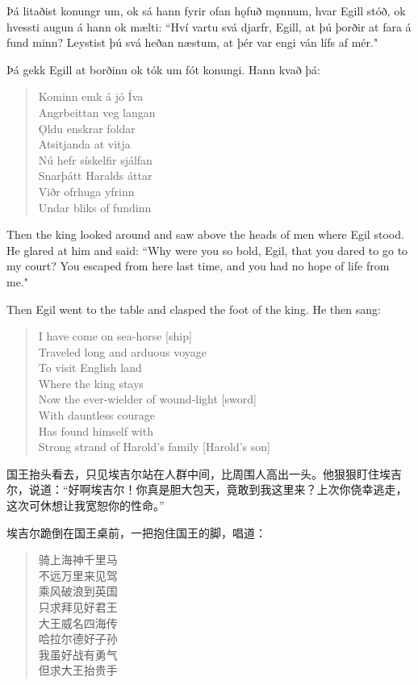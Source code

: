 \begin{paracol}{2}
  Þá litaðist konungr um, ok sá hann fyrir ofan hǫfuð mǫnnum, hvar Egill stóð, ok hvessti augun á hann ok mælti: ``Hví vartu svá djarfr, Egill, at þú þorðir at fara á fund minn? Leystist þú svá heðan næstum, at þér var engi ván lífs af mér."

  Þá gekk Egill at borðinu ok tók um fót konungi. Hann kvað þá:
  \begin{quote}
    Kominn emk á jó Íva\\
    Angrbeittan veg langan\\
    \MakeUppercase{ǫ}ldu enskrar foldar\\
    Atsitjanda at vitja\\
    Nú hefr sískelfir sjálfan\\
    Snarþátt Haralds áttar\\
    Viðr ofrhuga yfrinn\\
    Undar bliks of fundinn
  \end{quote}
  \switchcolumn
  Then the king looked around and saw above the heads of men where Egil stood. He glared at him and said: ``Why were you so bold, Egil, that you dared to go to my court? You escaped from here last time, and you had no hope of life from me."

  Then Egil went to the table and clasped the foot of the king. He then sang:
  \begin{quote}
    I have come on sea-horse [ship]\\
    Traveled long and arduous voyage\\
    To visit English land\\
    Where the king stays\\
    Now the ever-wielder of wound-light [sword]\\
    With dauntless courage\\
    Has found himself with\\
    Strong strand of Harold's family [Harold's son]
  \end{quote}
\end{paracol}
\begin{translation*}{}
  国王抬头看去，只见埃吉尔站在人群中间，比周围人高出一头。他狠狠盯住埃吉尔，说道：“好啊埃吉尔！你真是胆大包天，竟敢到我这里来？上次你侥幸逃走，这次可休想让我宽恕你的性命。”

  埃吉尔跪倒在国王桌前，一把抱住国王的脚，唱道：

  \begin{quote}
    骑上海神千里马\\
    不远万里来见驾\\
    乘风破浪到英国\\
    只求拜见好君王\\
    大王威名四海传\\
    哈拉尔德好子孙\\
    我虽好战有勇气\\
    但求大王抬贵手
  \end{quote}

\end{translation*}
